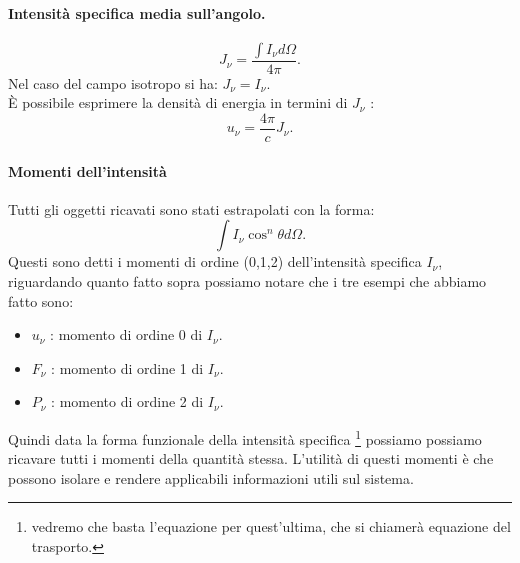 \paragraph{Intensità specifica media sull'angolo.}%
\[
	J_{\nu} = \frac{\int I_{\nu}d\Omega}{4\pi}
.\] 
Nel caso del campo isotropo si ha: $J_{\nu} = I_{\nu}$.\\
È possibile esprimere la densità di energia in termini di $J_{\nu}$ :
\[
	u_{\nu} = \frac{4\pi}{c}J_{\nu}
.\] 
\paragraph{Momenti dell'intensità}%
Tutti gli oggetti ricavati sono stati estrapolati con la forma:
\[
	\int I_{\nu} \cos^{n}\theta d\Omega
.\] 
Questi sono detti i momenti di ordine (0,1,2) dell'intensità specifica $I_{\nu}$, riguardando quanto fatto sopra possiamo notare che i tre esempi che abbiamo fatto sono:
\begin{itemize}
	\item $u_{\nu}$ : momento di ordine 0 di $I_{\nu}$.
	\item $F_{\nu}$ : momento di ordine 1 di $I_{\nu}$.
	\item $P_{\nu}$ : momento di ordine 2 di $I_{\nu}$.
\end{itemize}
Quindi data la forma funzionale della intensità specifica \footnote{vedremo che basta l'equazione per quest'ultima, che si chiamerà equazione del trasporto.} possiamo possiamo ricavare tutti i momenti della quantità stessa. L'utilità di questi momenti è che possono isolare e rendere applicabili informazioni utili sul sistema.\\

